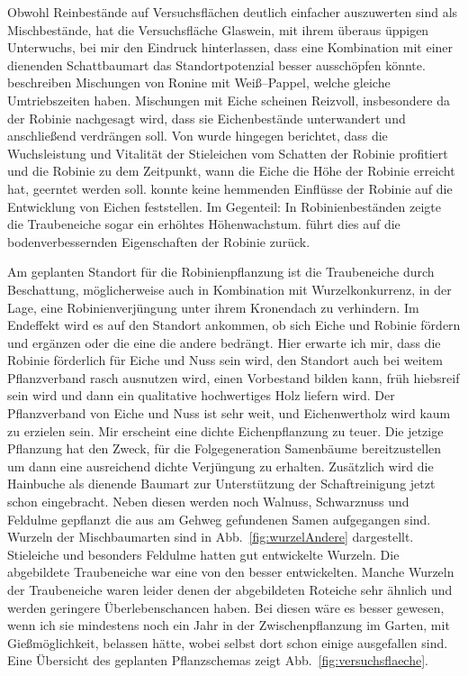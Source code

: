 \documentclass[twocolumn]{scrartcl}
\begin{document}
Obwohl Reinbestände auf Versuchsflächen deutlich einfacher auszuwerten sind als Mischbestände,
hat die Versuchsfläche Glaswein, mit ihrem überaus üppigen Unterwuchs, bei mir den Eindruck hinterlassen,
dass eine Kombination mit einer dienenden Schattbaumart das Standortpotenzial besser ausschöpfen könnte.
\citet{redei2006robiniePappel}
beschreiben Mischungen von Ronine mit Weiß--Pappel, welche gleiche
Umtriebszeiten haben. Mischungen mit Eiche scheinen Reizvoll,
insbesondere da der Robinie nachgesagt wird, dass sie Eichenbestände
unterwandert und anschließend verdrängen soll. Von \citet{kallina1888robinie} wurde
hingegen berichtet, dass die Wuchsleistung und Vitalität der
Stieleichen vom Schatten der Robinie profitiert und die Robinie zu dem
Zeitpunkt, wann die Eiche die Höhe der Robinie erreicht hat, geerntet
werden soll. \citet{feher2024robinie} konnte keine hemmenden Einflüsse
der Robinie auf die Entwicklung von Eichen feststellen. Im Gegenteil:
In Robinienbeständen zeigte die Traubeneiche sogar ein erhöhtes
Höhenwachstum. \citet{foeldes1903robinie} führt dies auf die
bodenverbessernden Eigenschaften der Robinie zurück.

Am geplanten Standort für die Robinienpflanzung ist die Traubeneiche durch Beschattung,
möglicherweise auch in Kombination mit Wurzelkonkurrenz, in der Lage, eine Robinienverjüngung unter ihrem Kronendach zu verhindern.
Im Endeffekt wird es auf
den Standort ankommen, ob sich Eiche und Robinie fördern und ergänzen
oder die eine die andere bedrängt. Hier erwarte ich mir, dass die
Robinie förderlich für Eiche und Nuss sein wird, den Standort auch bei
weitem Pflanzverband rasch ausnutzen wird, einen Vorbestand bilden
kann, früh hiebsreif sein wird und dann ein qualitative hochwertiges
Holz liefern wird. Der Pflanzverband von Eiche und Nuss ist
sehr weit, und Eichenwertholz wird kaum zu erzielen sein. Mir
erscheint eine dichte Eichenpflanzung zu teuer. Die jetzige Pflanzung
hat den Zweck, für die Folgegeneration Samenbäume bereitzustellen um
dann eine ausreichend dichte Verjüngung zu erhalten. Zusätzlich wird
die Hainbuche als dienende Baumart zur Unterstützung der
Schaftreinigung jetzt schon eingebracht. Neben diesen werden noch
Walnuss, Schwarznuss und Feldulme gepflanzt die aus am Gehweg gefundenen
Samen aufgegangen sind. Wurzeln der Mischbaumarten sind in
Abb.~\ref{fig:wurzelAndere} dargestellt. Stieleiche und besonders Feldulme
hatten gut entwickelte Wurzeln. Die abgebildete Traubeneiche war eine
von den besser entwickelten. Manche Wurzeln der Traubeneiche waren leider denen der abgebildeten
Roteiche sehr ähnlich und werden geringere Überlebenschancen haben. Bei diesen wäre es besser gewesen, wenn ich sie mindestens
noch ein Jahr in der Zwischenpflanzung im Garten, mit Gießmöglichkeit,
belassen hätte, wobei selbst dort schon einige ausgefallen
sind. Eine Übersicht des geplanten Pflanzschemas zeigt
Abb.~\ref{fig:versuchsflaeche}.
\end{document}

